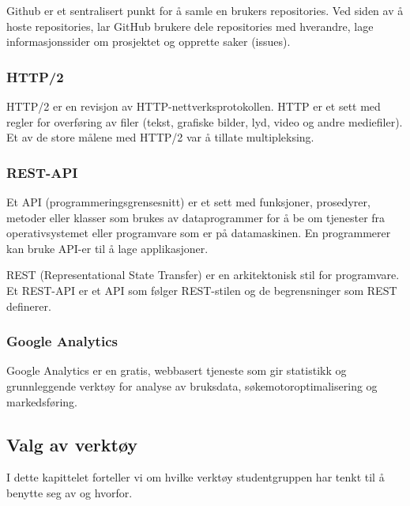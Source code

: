 Github\cite{TechTarget} er et sentralisert punkt for å samle en brukers repositories. Ved siden av å hoste repositories, lar GitHub brukere dele repositories med hverandre, lage informasjonssider om prosjektet og opprette saker (issues).

\subsubsection{HTTP/2}
HTTP/2\cite{Belshe2015httpv} er en revisjon av HTTP-nettverksprotokollen. HTTP er et sett med regler for overføring av filer (tekst, grafiske bilder, lyd, video og andre mediefiler). Et av de store målene med HTTP/2 var å tillate multipleksing.

\subsubsection{REST-API}
Et API (programmeringsgrensesnitt) er et sett med funksjoner, prosedyrer, metoder eller klasser som brukes av dataprogrammer for å be om tjenester fra operativsystemet eller programvare som er på datamaskinen. En programmerer kan bruke API-er til å lage applikasjoner.

REST (Representational State Transfer) er en arkitektonisk stil for programvare. Et REST-API\cite{Masse2011radr} er et API som følger REST-stilen og de begrensninger som REST definerer.

\subsubsection{Google Analytics}
\label{sec:google-analytics}
Google Analytics \cite{google2019gtk} er en gratis, webbasert tjeneste som gir statistikk og grunnleggende verktøy for analyse av bruksdata, søkemotoroptimalisering og markedsføring.

\subsection{Valg av verktøy}
I dette kapittelet forteller vi om hvilke verktøy studentgruppen har tenkt til å benytte seg av og hvorfor.

